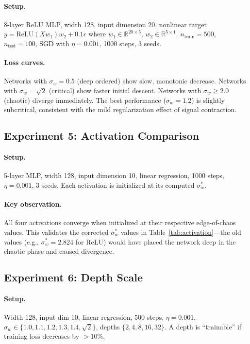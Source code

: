 \documentclass[10pt]{article}
\theoremstyle{definition}
\begin{document}
\paragraph{Setup.} 8-layer ReLU MLP, width 128, input dimension 20, nonlinear target $y = \text{ReLU}(Xw_1)w_2 + 0.1\epsilon$ where $w_1 \in \mathbb{R}^{20 \times 5}$, $w_2 \in \mathbb{R}^{5 \times 1}$.
$n_{\text{train}} = 500$, $n_{\text{test}} = 100$, SGD with $\eta = 0.001$, 1000 steps, 3 seeds.

\paragraph{Loss curves.}
Networks with $\sigma_w = 0.5$ (deep ordered) show slow, monotonic decrease.
Networks with $\sigma_w = \sqrt{2}$ (critical) show faster initial descent.
Networks with $\sigma_w \geq 2.0$ (chaotic) diverge immediately.
The best performance ($\sigma_w = 1.2$) is slightly subcritical, consistent with the mild regularization effect of signal contraction.

\subsection{Experiment 5: Activation Comparison}

\paragraph{Setup.} 5-layer MLP, width 128, input dimension 10, linear regression, 1000 steps, $\eta = 0.001$, 3 seeds.
Each activation is initialized at its computed $\sigma_w^*$.

\paragraph{Key observation.}
All four activations converge when initialized at their respective edge-of-chaos values.
This validates the corrected $\sigma_w^*$ values in Table~\ref{tab:activation}---the old values (e.g., $\sigma_w^* = 2.824$ for ReLU) would have placed the network deep in the chaotic phase and caused divergence.

\subsection{Experiment 6: Depth Scale}

\paragraph{Setup.} Width 128, input dim 10, linear regression, 500 steps, $\eta = 0.001$.
$\sigma_w \in \{1.0, 1.1, 1.2, 1.3, 1.4, \sqrt{2}\}$, depths $\{2, 4, 8, 16, 32\}$.
A depth is ``trainable'' if training loss decreases by ${>}10\%$.
\end{document}
